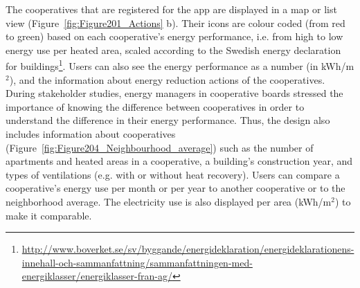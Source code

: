 The cooperatives that are registered for the app are displayed in a map or list view (Figure~\ref{fig:Figure201_Actions} b). Their icons are colour coded (from red to green) based on each cooperative's energy performance, i.e. from high to low energy use per heated area, scaled according to the Swedish energy declaration for buildings\footnote{\url{http://www.boverket.se/sv/byggande/energideklaration/energideklarationens-innehall-och-sammanfattning/sammanfattningen-med-energiklasser/energiklasser-fran-ag/}}. 
% 
Users can also see the energy performance as a number (in kWh/m$^2$), and the information about energy reduction actions of the cooperatives. %
% 
During stakeholder studies, energy managers in cooperative boards stressed the importance of knowing the difference between cooperatives in order to understand the difference in their energy performance. Thus, the design also includes information about cooperatives (Figure~\ref{fig:Figure204_Neighbourhood_average}) such as the number of apartments and heated areas in a cooperative, a building's construction year, and types of ventilations (e.g. with or without heat recovery).
% 
Users can compare a cooperative's energy use per month or per year to another cooperative or to the neighborhood average. The electricity use is also displayed per area (kWh/m$^2$) to make it comparable.
